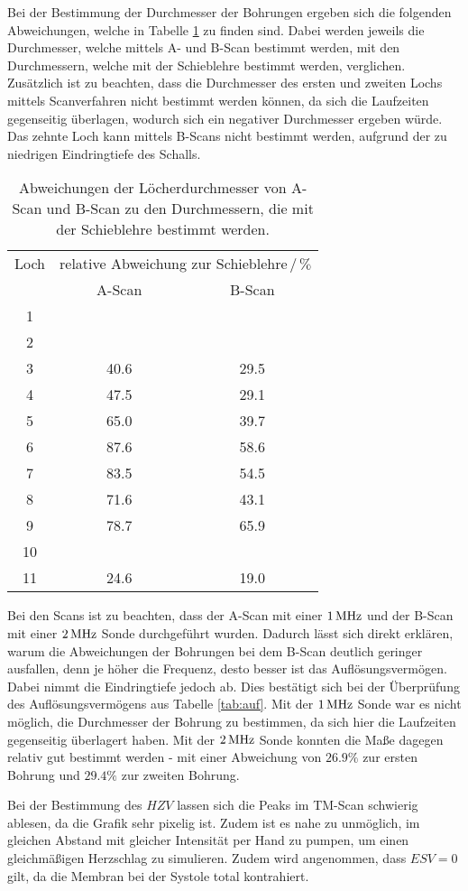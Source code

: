 Bei der Bestimmung der Durchmesser der Bohrungen ergeben sich die folgenden
Abweichungen, welche in Tabelle \ref{tab:abweichung} zu finden sind.
Dabei werden jeweils die Durchmesser, welche mittels A- und B-Scan bestimmt werden, mit den Durchmessern, welche mit der Schieblehre bestimmt werden, verglichen. Zusätzlich ist zu beachten, dass die Durchmesser des ersten und zweiten Lochs mittels Scanverfahren nicht bestimmt werden können, da sich die Laufzeiten gegenseitig überlagen, wodurch sich ein negativer Durchmesser ergeben würde. Das zehnte Loch kann mittels B-Scans nicht bestimmt werden, aufgrund der zu niedrigen Eindringtiefe des Schalls.
\begin{table}
  \centering
  \begin{tabular}{c|cc}
    \toprule
    \multicolumn{1}{c|}{Loch} & \multicolumn{2}{c}{relative Abweichung zur Schieblehre$\,/\,\%$}\\
    & {A-Scan} & {B-Scan} \\
  \midrule
  1  &  \hrulefill  & \hrulefill  \\
  2  &  \hrulefill  & \hrulefill  \\
  3  &  40.6        & 29.5  \\
  4  &  47.5        & 29.1  \\
  5  &  65.0        & 39.7  \\
  6  &  87.6        & 58.6  \\
  7  &  83.5        & 54.5  \\
  8  &  71.6        & 43.1  \\
  9  &  78.7        & 65.9  \\
  10 &  \hrulefill  & \hrulefill  \\
  11 &  24.6        & 19.0  \\
  \bottomrule
  \end{tabular}
  \caption{Abweichungen der Löcherdurchmesser von A-Scan und B-Scan zu den Durchmessern, die mit der Schieblehre bestimmt werden.}
  \label{tab:abweichung}
\end{table}
Bei den Scans ist zu beachten, dass der A-Scan mit einer $1\,\si{\mega\hertz}$ und der B-Scan
mit einer $2\,\si{\mega\hertz}$ Sonde durchgeführt wurden. Dadurch lässt sich direkt erklären, warum die Abweichungen der Bohrungen bei dem B-Scan deutlich geringer ausfallen, denn je höher die Frequenz, desto besser ist das Auflösungsvermögen. Dabei nimmt die Eindringtiefe jedoch ab. Dies bestätigt sich bei der Überprüfung des Auflösungsvermögens aus Tabelle \ref{tab:auf}. Mit der $1\,\si{\mega\hertz}$ Sonde war es nicht möglich, die Durchmesser der Bohrung zu bestimmen, da sich hier die Laufzeiten gegenseitig überlagert haben. Mit der $2\,\si{\mega\hertz}$ Sonde konnten die Maße dagegen relativ gut bestimmt werden - mit einer Abweichung von $26.9\%$ zur ersten Bohrung und $29.4\%$ zur zweiten Bohrung.

\noindent Bei der Bestimmung des $HZV$ lassen sich die Peaks im TM-Scan schwierig ablesen, da die Grafik sehr pixelig ist. Zudem ist es nahe zu unmöglich, im gleichen Abstand mit gleicher Intensität per Hand zu pumpen, um einen gleichmäßigen Herzschlag zu simulieren. Zudem wird angenommen, dass $ESV = 0$ gilt, da die Membran bei der Systole total kontrahiert.
